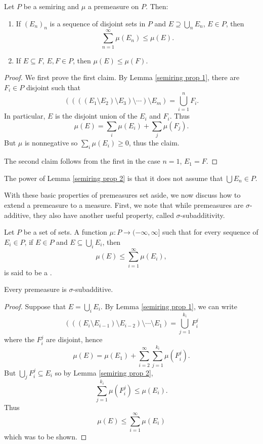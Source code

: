 \begin{lemma}
\label{semiring prop 2}
Let $P$ be a semiring and $\mu$ a premeasure on $P$. Then:
\begin{enumerate}
\item If $(E_n)_n$ is a sequence of disjoint sets in $P$ and $E \supseteq \bigcup_n E_n$, $E \in P$, then
\[\sum_{n=1}^\infty \mu(E_n) \leq \mu(E).\]
\item If $E \subseteq F$, $E, F \in P$, then $\mu(E) \leq \mu(F)$.
\end{enumerate}
\end{lemma}
\begin{proof}
We first prove the first claim. By Lemma \ref{semiring prop 1}, there are $F_i \in P$ disjoint such that
\[((((E_1 \setminus E_2) \setminus E_3) \setminus \cdots) \setminus E_m) = \bigcup_{i=1}^n F_i.\]
In particular, $E$ is the disjoint union of the $E_i$ and $F_i$. Thus
\[\mu(E) = \sum_i \mu(E_i) + \sum_j \mu(F_j).\]
But $\mu$ is nonnegative so $\sum_i \mu(E_i) \geq 0$, thus the claim.

The second claim follows from the first in the case $n = 1$, $E_1 = F$.
\end{proof}

\begin{subsec}
The power of Lemma \ref{semiring prop 2} is that it does not assume that $\bigcup E_n \in P$.
\end{subsec}

\begin{subsec}
With these basic properties of premeasures set aside, we now discuss how to extend a premeasure to a measure.
First, we note that while premeasures are $\sigma$-additive, they also have another useful property, called $\sigma$-subadditivity.
\end{subsec}

\begin{definition}
Let $P$ be a set of sets. A function $\mu: P \to (-\infty, \infty]$ such that for every sequence of $E_i \in P$, if $E \in P$ and $E \subseteq \bigcup_i E_i$, then
\[\mu(E) \leq \sum_{i=1}^\infty \mu(E_i),\]
is said to be a .
\end{definition}

\begin{lemma}
Every premeasure is $\sigma$-subadditive.
\end{lemma}
\begin{proof}
Suppose that $E = \bigcup_i E_i$. By Lemma \ref{semiring prop 1}, we can write
\[(((E_i \setminus E_{i-1}) \setminus E_{i-2}) \setminus \cdots \setminus E_1) = \bigcup_{j=1}^{k_i} F_i^j\]
where the $F_i^j$ are disjoint, hence
\[\mu(E) = \mu(E_1) + \sum_{i=2}^\infty \sum_{j=1}^{k_i} \mu(F_i^j).\]
But $\bigcup_j F_i^j \subseteq E_i$ so by Lemma \ref{semiring prop 2},
\[\sum_{j=1}^{k_i} \mu(F_i^j) \leq \mu(E_i).\]
Thus
\[\mu(E) \leq \sum_{i=1}^\infty \mu(E_i)\]
which was to be shown.
\end{proof}

